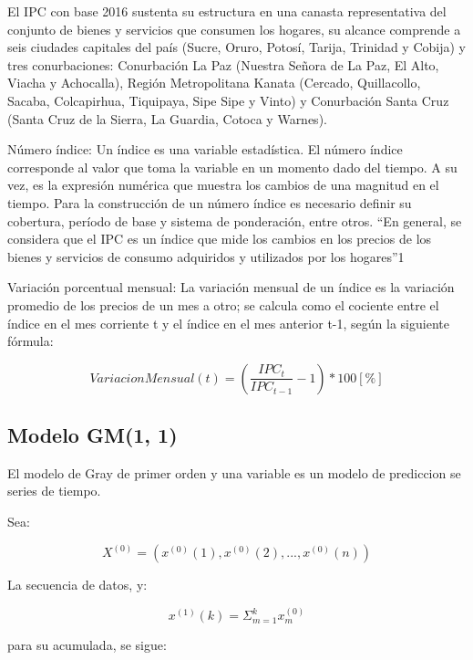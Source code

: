 \documentclass[a4paper,10pt]{article}
\begin{document}
El IPC con base 2016 sustenta su estructura en una canasta representativa del conjunto de bienes y servicios que consumen los hogares, su alcance comprende a seis ciudades capitales del país (Sucre, Oruro, Potosí, Tarija, Trinidad y Cobija) y tres conurbaciones: Conurbación La Paz (Nuestra Señora de La Paz, El Alto, Viacha y Achocalla), Región Metropolitana Kanata (Cercado, Quillacollo, Sacaba, Colcapirhua, Tiquipaya, Sipe Sipe y Vinto) y Conurbación Santa Cruz (Santa Cruz de la Sierra, La Guardia, Cotoca y Warnes).

Número índice: Un índice es una variable estadística. El número índice corresponde al valor que toma la variable en un momento dado del tiempo. A su vez, es la expresión numérica que muestra los cambios de una magnitud en el tiempo. Para la construcción de un número índice es necesario definir su cobertura, período de base y sistema de ponderación, entre otros.
“En general, se considera que el IPC es un índice que mide los cambios en los precios de los bienes y servicios de consumo adquiridos y utilizados por los hogares”1

Variación porcentual mensual: La variación mensual de un índice es la variación promedio de los precios de un mes a otro; se calcula como el cociente entre el índice en el mes corriente t y el índice en el mes anterior t-1, según la siguiente fórmula: ~\cite{ine_ipc}

\begin{equation}
 Variacion Mensual (t) = \left( \frac{IPC_t}{IPC_{t-1}} -1 \right) * 100 [\%]
\end{equation}

\subsection{Modelo GM(1, 1)}
\newcommand{\gm}{\emph{GM(1,1)}}
El modelo de Gray de primer orden y una variable es un modelo de prediccion se series de tiempo.

Sea:

\begin{equation}
 X^{(0)} = \left( x^{(0)}(1), x^{(0)}(2),..., x^{(0)}(n) \right)
\end{equation}

La secuencia de datos, y:

\begin{equation}
 x^{(1)}(k) = \Sigma_{m = 1}^{k} x^{(0)}_m
\end{equation}

para su acumulada, se sigue:
\end{document}
